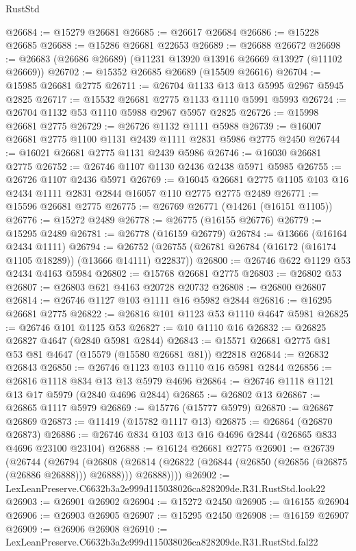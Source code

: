 \begin{lexlean}{RustStd}
\begin{coremodule}
@26684 := @15279 @26681
@26685 := @26617 @26684
@26686 := @15228 @26685
@26688 := @15286 @26681 @22653
@26689 := @26688 @26672
@26698 := @26683 (@26686 @26689) (@11231 @13920 @13916 @26669 @13927 (@11102 @26669))
@26702 := @15352 @26685 @26689 (@15509 @26616)
@26704 := @15985 @26681 @2775
@26711 := @26704 @1133 @13 @13 @5995 @2967 @5945 @2825
@26717 := @15532 @26681 @2775 @1133 @1110 @5991 @5993
@26724 := @26704 @1132 @53 @1110 @5988 @2967 @5957 @2825
@26726 := @15998 @26681 @2775
@26729 := @26726 @1132 @1111 @5988
@26739 := @16007 @26681 @2775 @1100 @1131 @2439 @1111 @2831 @5986 @2775 @2450
@26744 := @16021 @26681 @2775 @1131 @2439 @5986
@26746 := @16030 @26681 @2775
@26752 := @26746 @1107 @1130 @2436 @2438 @5971 @5985
@26755 := @26726 @1107 @2436 @5971
@26769 := @16045 @26681 @2775 @1105 @103 @16 @2434 @1111 @2831 @2844 @16057 @110 @2775 @2775 @2489
@26771 := @15596 @26681 @2775
@26775 := @26769 @26771 (@14261 (@16151 @1105))
@26776 := @15272 @2489
@26778 := @26775 (@16155 @26776)
@26779 := @15295 @2489
@26781 := @26778 (@16159 @26779)
@26784 := @13666 (@16164 @2434 @1111)
@26794 := @26752 (@26755 (@26781 @26784 (@16172 (@16174 @1105 @18289)) (@13666 @14111) @22837))
@26800 := @26746 @622 @1129 @53 @2434 @4163 @5984
@26802 := @15768 @26681 @2775
@26803 := @26802 @53
@26807 := @26803 @621 @4163 @20728 @20732
@26808 := @26800 @26807
@26814 := @26746 @1127 @103 @1111 @16 @5982 @2844
@26816 := @16295 @26681 @2775
@26822 := @26816 @101 @1123 @53 @1110 @4647 @5981
@26825 := @26746 @101 @1125 @53
@26827 := @10 @1110 @16
@26832 := @26825 @26827 @4647 (@2840 @5981 @2844)
@26843 := @15571 @26681 @2775 @81 @53 @81 @4647 (@15579 (@15580 @26681 @81)) @22818
@26844 := @26832 @26843
@26850 := @26746 @1123 @103 @1110 @16 @5981 @2844
@26856 := @26816 @1118 @834 @13 @13 @5979 @4696
@26864 := @26746 @1118 @1121 @13 @17 @5979 (@2840 @4696 @2844)
@26865 := @26802 @13
@26867 := @26865 @1117 @5979
@26869 := @15776 (@15777 @5979)
@26870 := @26867 @26869
@26873 := @11419 (@15782 @1117 @13)
@26875 := @26864 (@26870 @26873)
@26886 := @26746 @834 @103 @13 @16 @4696 @2844 (@26865 @833 @4696 @23100 @23104)
@26888 := @16124 @26681 @2775
@26901 := @26739
    (@26744
      (@26794
        (@26808
          (@26814 (@26822 (@26844 (@26850 (@26856 (@26875 (@26886 @26888))) @26888))) @26888))))
@26902 := LexLeanPreserve.C6632b3a2e999d115038026ca828209de.R31.RustStd.look22
@26903 := @26901 @26902
@26904 := @15272 @2450
@26905 := @16155 @26904
@26906 := @26903 @26905
@26907 := @15295 @2450
@26908 := @16159 @26907
@26909 := @26906 @26908
@26910 := LexLeanPreserve.C6632b3a2e999d115038026ca828209de.R31.RustStd.fal22

\end{coremodule}
\end{lexlean}

